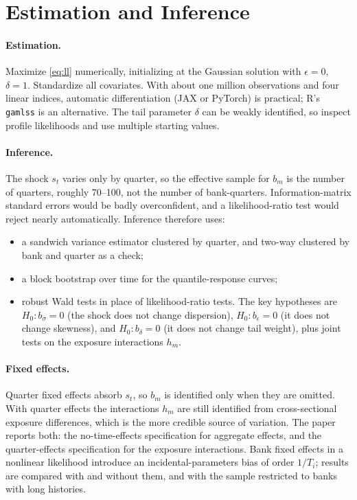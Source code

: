 \documentclass[11pt]{article}
\begin{document}
\section{Estimation and Inference}

\paragraph{Estimation.} Maximize \eqref{eq:ll} numerically, initializing at the Gaussian solution with $\epsilon=0$, $\delta=1$. Standardize all covariates. With about one million observations and four linear indices, automatic differentiation (JAX or PyTorch) is practical; R's \texttt{gamlss} is an alternative. The tail parameter $\delta$ can be weakly identified, so inspect profile likelihoods and use multiple starting values.

\paragraph{Inference.} The shock $s_t$ varies only by quarter, so the effective sample for $b_m$ is the number of quarters, roughly 70--100, not the number of bank-quarters. Information-matrix standard errors would be badly overconfident, and a likelihood-ratio test would reject nearly automatically. Inference therefore uses:
\begin{itemize}
  \item a sandwich variance estimator clustered by quarter, and two-way clustered by bank and quarter as a check;
  \item a block bootstrap over time for the quantile-response curves;
  \item robust Wald tests in place of likelihood-ratio tests. The key hypotheses are $H_0\!:b_\sigma=0$ (the shock does not change dispersion), $H_0\!:b_\epsilon=0$ (it does not change skewness), and $H_0\!:b_\delta=0$ (it does not change tail weight), plus joint tests on the exposure interactions $h_m$.
\end{itemize}

\paragraph{Fixed effects.} Quarter fixed effects absorb $s_t$, so $b_m$ is identified only when they are omitted. With quarter effects the interactions $h_m$ are still identified from cross-sectional exposure differences, which is the more credible source of variation. The paper reports both: the no-time-effects specification for aggregate effects, and the quarter-effects specification for the exposure interactions. Bank fixed effects in a nonlinear likelihood introduce an incidental-parameters bias of order $1/T_i$; results are compared with and without them, and with the sample restricted to banks with long histories.
\end{document}
